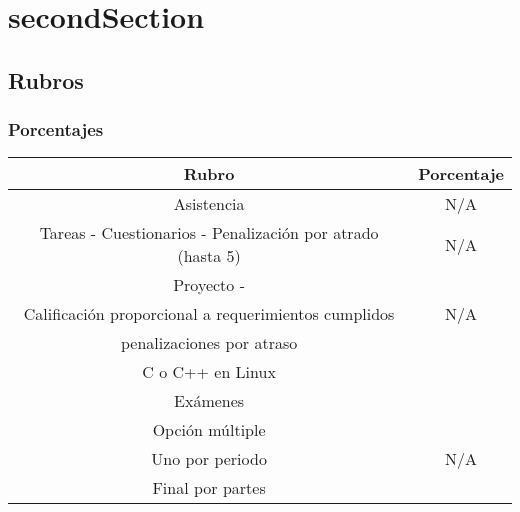 \newpage
\part{\acrlong{secondSection}}
\chapter{Rubros}
\section{Porcentajes}

\begin{center}
	\begin{tabular}{ | c | c |}
		\hline
		Rubro & Porcentaje \\
		\hline
		Asistencia & N/A \\
		\hline
		Tareas - Cuestionarios - Penalizaci\'{o}n por atrado (hasta 5) & N/A\\
		\hline
		Proyecto - & \\
		Calificaci\'{o}n proporcional a requerimientos cumplidos & N/A\\
		penalizaciones por atraso & \\
		C o C++ en Linux & \\
		\hline
		Ex\'{a}menes & \\
		Opci\'{o}n m\'{u}ltiple & \\
		Uno por periodo & N/A\\
		Final por partes & \\
		\hline
	\end{tabular}
\end{center}
